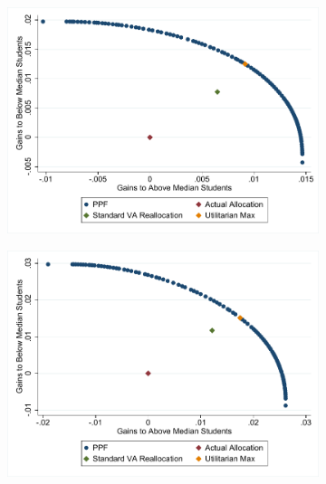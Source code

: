 \documentclass[12pt]{article}
\theoremstyle{definition}
\theoremstyle{definition}
\theoremstyle{definition}
\theoremstyle{definition}
\begin{document}
\begin{figure}[H]
    \centering
    
    \begin{subfigure}[b]{0.45\textwidth}
        \includegraphics[width=1\textwidth]{Working_Paper/WP_Figures/WithinSchoolReallocationELA.pdf}
    \end{subfigure}
    \begin{subfigure}[b]{0.45\textwidth}
        \includegraphics[width=1\textwidth]{Working_Paper/WP_Figures/WithinSchoolReallocationMath.pdf}
    \end{subfigure}

\end{figure}
\end{document}

